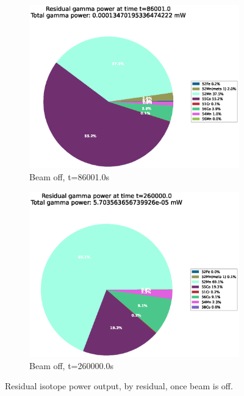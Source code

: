 \begin{figure}[htb]
\centering
\begin{subfigure}{0.49\textwidth}
  \includegraphics[width=\linewidth]{chapters/activity_code/fe-activity-v2/residual-energy/0166_86001.eps}
  \caption{Beam off, t=86001.0s}
  \label{fig:activity-v2-residual-3}
\end{subfigure}\hfil %
\begin{subfigure}{0.49\textwidth}
  \includegraphics[width=\linewidth]{chapters/activity_code/fe-activity-v2/residual-energy/0300_260000.eps}
  \caption{{Beam off, t=260000.0s}}
  \label{fig:activity-v2-residual-4}
\end{subfigure}
\caption{Residual isotope power output, by residual, once beam is off.}
\label{fig:activity-v2-residual-b}
\end{figure}

